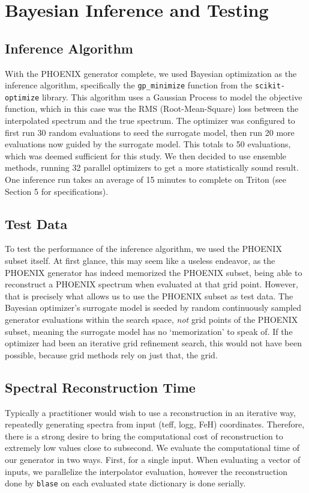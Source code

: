 \documentclass[twocolumn]{aastex631}
\begin{document}
\section{Bayesian Inference and Testing}
\subsection{Inference Algorithm}
With the PHOENIX generator complete, we used Bayesian optimization as the
inference algorithm, specifically the \texttt{gp\_minimize} function from
the \texttt{scikit-optimize} library. This algorithm uses a Gaussian Process
to model the objective function, which in this case was the RMS 
(Root-Mean-Square) loss between the interpolated spectrum and the true 
spectrum. The optimizer was configured to first run 30 random evaluations to 
seed the surrogate model, then run 20 more evaluations now guided by the 
surrogate model. This totals to 50 evaluations, which was deemed sufficient 
for this study. We then decided to use ensemble methods, running 32 parallel
optimizers to get a more statistically sound result. One inference run 
takes an average of 15 minutes to complete on Triton (see Section 5 for
specifications).

\subsection{Test Data}
To test the performance of the inference algorithm, we used the PHOENIX subset
itself. At first glance, this may seem like a useless endeavor, as the 
PHOENIX generator has indeed memorized the PHOENIX subset, being able to
reconstruct a PHOENIX spectrum when evaluated at that grid point. However,
that is precisely what allows us to use the PHOENIX subset as test data.
The Bayesian optimizer's surrogate model is seeded by random continuously 
sampled generator evaluations within the search space, \textit{not} grid 
points of the PHOENIX subset, meaning the surrogate model has no `memorization' 
to speak of. If the optimizer had been an iterative grid refinement search, 
this would not have been possible, because grid methods rely on just that, 
the grid.

\subsection{Spectral Reconstruction Time}
Typically a practitioner would wish to use a reconstruction in an iterative 
way, repeatedly generating spectra from input (teff, logg, FeH) 
coordinates.  Therefore, there is a strong desire to bring the computational 
cost of reconstruction to extremely low values close to subsecond.
We evaluate the computational time of our generator in two ways.  First, 
for a single input. When evaluating a vector of inputs, we parallelize the interpolator evaluation, 
however the reconstruction done by \texttt{blase} on each evaluated state 
dictionary is done serially.
\end{document}
